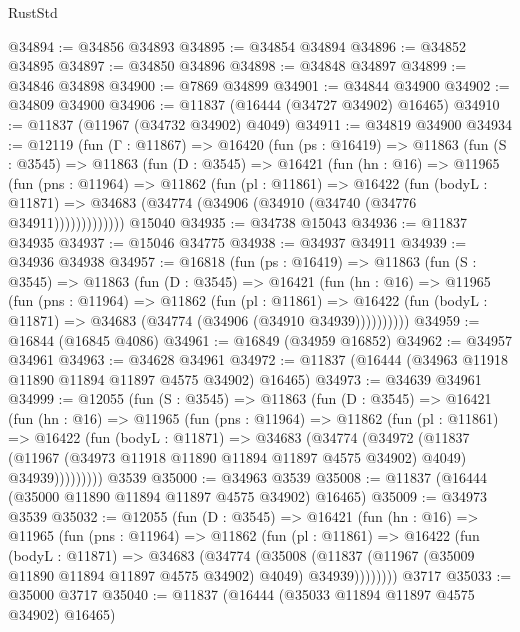 \begin{lexlean}{RustStd}
\begin{coremodule}
@34894 := @34856 @34893
@34895 := @34854 @34894
@34896 := @34852 @34895
@34897 := @34850 @34896
@34898 := @34848 @34897
@34899 := @34846 @34898
@34900 := @7869 @34899
@34901 := @34844 @34900
@34902 := @34809 @34900
@34906 := @11837 (@16444 (@34727 @34902) @16465)
@34910 := @11837 (@11967 (@34732 @34902) @4049)
@34911 := @34819 @34900
@34934 := @12119
    (fun (Γ : @11867) =>
    @16420
      (fun (ps : @16419) =>
      @11863
        (fun (S : @3545) =>
        @11863
          (fun (D : @3545) =>
          @16421
            (fun (hn : @16) =>
            @11965
              (fun (pns : @11964) =>
              @11862
                (fun (pl : @11861) =>
                @16422
                  (fun (bodyL : @11871) =>
                  @34683 (@34774 (@34906 (@34910 (@34740 (@34776 @34911)))))))))))))
    @15040
@34935 := @34738 @15043
@34936 := @11837 @34935
@34937 := @15046 @34775
@34938 := @34937 @34911
@34939 := @34936 @34938
@34957 := @16818
    (fun (ps : @16419) =>
    @11863
      (fun (S : @3545) =>
      @11863
        (fun (D : @3545) =>
        @16421
          (fun (hn : @16) =>
          @11965
            (fun (pns : @11964) =>
            @11862
              (fun (pl : @11861) =>
              @16422 (fun (bodyL : @11871) => @34683 (@34774 (@34906 (@34910 @34939))))))))))
@34959 := @16844 (@16845 @4086)
@34961 := @16849 (@34959 @16852)
@34962 := @34957 @34961
@34963 := @34628 @34961
@34972 := @11837 (@16444 (@34963 @11918 @11890 @11894 @11897 @4575 @34902) @16465)
@34973 := @34639 @34961
@34999 := @12055
    (fun (S : @3545) =>
    @11863
      (fun (D : @3545) =>
      @16421
        (fun (hn : @16) =>
        @11965
          (fun (pns : @11964) =>
          @11862
            (fun (pl : @11861) =>
            @16422
              (fun (bodyL : @11871) =>
              @34683
                (@34774
                  (@34972
                    (@11837
                      (@11967 (@34973 @11918 @11890 @11894 @11897 @4575 @34902) @4049)
                      @34939)))))))))
    @3539
@35000 := @34963 @3539
@35008 := @11837 (@16444 (@35000 @11890 @11894 @11897 @4575 @34902) @16465)
@35009 := @34973 @3539
@35032 := @12055
    (fun (D : @3545) =>
    @16421
      (fun (hn : @16) =>
      @11965
        (fun (pns : @11964) =>
        @11862
          (fun (pl : @11861) =>
          @16422
            (fun (bodyL : @11871) =>
            @34683
              (@34774
                (@35008
                  (@11837 (@11967 (@35009 @11890 @11894 @11897 @4575 @34902) @4049) @34939))))))))
    @3717
@35033 := @35000 @3717
@35040 := @11837 (@16444 (@35033 @11894 @11897 @4575 @34902) @16465)

\end{coremodule}
\end{lexlean}
